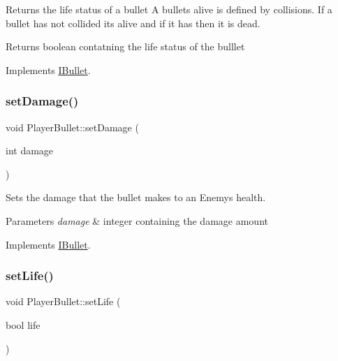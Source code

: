 Returns the life status of a bullet A bullets alive is defined by collisions. If a bullet has not collided its alive and if it has then it is dead. 

\begin{DoxyReturn}{Returns}
boolean contatning the life status of the bulllet 
\end{DoxyReturn}


Implements \hyperlink{class_i_bullet}{I\+Bullet}.

\mbox{\label{class_player_bullet_a09347ab7665742fc7d492fe26c3a6bce}} 
\subsubsection{\texorpdfstring{set\+Damage()}{setDamage()}}
{\footnotesize\ttfamily void Player\+Bullet\+::set\+Damage (\begin{DoxyParamCaption}\item[{int}]{damage }\end{DoxyParamCaption})\hspace{0.3cm}{\ttfamily [virtual]}}



Sets the damage that the bullet makes to an Enemy\textquotesingle{}s health. 


\begin{DoxyParams}{Parameters}
{\em damage} & integer containing the damage amount \\
\hline
\end{DoxyParams}


Implements \hyperlink{class_i_bullet}{I\+Bullet}.

\mbox{\label{class_player_bullet_af713549c4bb9a2400a7929564f5b81ff}} 
\subsubsection{\texorpdfstring{set\+Life()}{setLife()}}
{\footnotesize\ttfamily void Player\+Bullet\+::set\+Life (\begin{DoxyParamCaption}\item[{bool}]{life }\end{DoxyParamCaption})\hspace{0.3cm}{\ttfamily [virtual]}}



